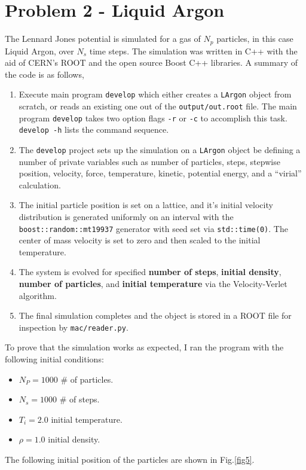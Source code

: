 \documentclass[singlepage,notitlepage,nofootinbib,11pt]{revtex4-1}
\begin{document}
\section{Problem 2 - Liquid Argon}
The Lennard Jones potential is simulated for a gas of $N_p$ particles, in this case Liquid Argon, over $N_s$ time steps. The simulation was written in C++ with the aid of CERN's ROOT and the open source Boost C++ libraries. A summary of the code is as follows,
\begin{enumerate}
\item Execute main program \verb|develop| which either creates a \verb|LArgon| object from scratch, or reads an existing one out of the \verb|output/out.root| file. The main program \verb|develop| takes two option flags \verb|-r| or \verb|-c| to accomplish this task. \verb|develop -h| lists the command sequence.
\item The \verb|develop| project sets up the simulation on a \verb|LArgon| object be defining a number of private variables such as number of particles, steps, stepwise position, velocity, force, temperature, kinetic, potential energy, and a ``virial'' calculation.
\item The initial particle position is set on a lattice, and it's initial velocity distribution is generated uniformly on an interval with the \verb|boost::random::mt19937| generator with seed set via \verb|std::time(0)|. The center of mass velocity is set to zero and then scaled to the initial temperature.
\item The system is evolved for specified {\bf number of steps}, {\bf initial density}, {\bf number of particles}, and {\bf initial temperature} via the Velocity-Verlet algorithm.
\item The final simulation completes and the object is stored in a ROOT file for inspection by \verb|mac/reader.py|.
\end{enumerate}
To prove that the simulation works as expected, I ran the program with the following initial conditions:
\begin{itemize}
\item $N_P = 1000$ \# of particles. 
\item $N_s = 1000$ \# of steps.
\item $T_i = 2.0$ initial temperature.
\item $\rho = 1.0$ initial density.
\end{itemize}
The following initial position of the particles are shown in Fig.\ref{fig5}.
\end{document}
